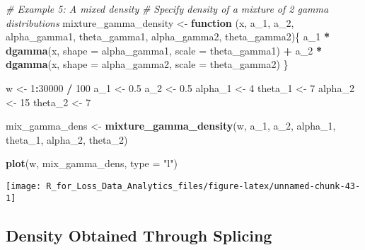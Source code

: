\documentclass[]{book}
\newenvironment{Shaded}{\begin{snugshade}}{\end{snugshade}}
\newcommand{\KeywordTok}[1]{\textcolor[rgb]{0.13,0.29,0.53}{\textbf{#1}}}
\newcommand{\DataTypeTok}[1]{\textcolor[rgb]{0.13,0.29,0.53}{#1}}
\newcommand{\DecValTok}[1]{\textcolor[rgb]{0.00,0.00,0.81}{#1}}
\newcommand{\FloatTok}[1]{\textcolor[rgb]{0.00,0.00,0.81}{#1}}
\newcommand{\StringTok}[1]{\textcolor[rgb]{0.31,0.60,0.02}{#1}}
\newcommand{\CommentTok}[1]{\textcolor[rgb]{0.56,0.35,0.01}{\textit{#1}}}
\newcommand{\ControlFlowTok}[1]{\textcolor[rgb]{0.13,0.29,0.53}{\textbf{#1}}}
\newcommand{\OperatorTok}[1]{\textcolor[rgb]{0.81,0.36,0.00}{\textbf{#1}}}
\newcommand{\NormalTok}[1]{#1}
\theoremstyle{definition}
\theoremstyle{definition}
\theoremstyle{definition}
\theoremstyle{remark}
\begin{document}
\begin{Shaded}
\begin{Highlighting}[]
\CommentTok{# Example 5: A mixed density}
\CommentTok{# Specify density of a mixture of 2 gamma distributions}
\NormalTok{mixture_gamma_density <-}\StringTok{ }\ControlFlowTok{function}\NormalTok{ (x, a_}\DecValTok{1}\NormalTok{, a_}\DecValTok{2}\NormalTok{, alpha_gamma1, theta_gamma1, alpha_gamma2,}
\NormalTok{                                   theta_gamma2)\{}
\NormalTok{  a_}\DecValTok{1} \OperatorTok{*}\StringTok{ }\KeywordTok{dgamma}\NormalTok{(x, }\DataTypeTok{shape =}\NormalTok{ alpha_gamma1, }\DataTypeTok{scale =}\NormalTok{ theta_gamma1) }\OperatorTok{+}\StringTok{ }\NormalTok{a_}\DecValTok{2} \OperatorTok{*}\StringTok{ }
\StringTok{    }\KeywordTok{dgamma}\NormalTok{(x, }\DataTypeTok{shape =}\NormalTok{ alpha_gamma2, }\DataTypeTok{scale =}\NormalTok{ theta_gamma2)}
\NormalTok{\}}

\NormalTok{w <-}\StringTok{ }\DecValTok{1}\OperatorTok{:}\DecValTok{30000} \OperatorTok{/}\StringTok{ }\DecValTok{100}
\NormalTok{a_}\DecValTok{1}\NormalTok{ <-}\StringTok{ }\FloatTok{0.5}
\NormalTok{a_}\DecValTok{2}\NormalTok{ <-}\StringTok{ }\FloatTok{0.5}
\NormalTok{alpha_}\DecValTok{1}\NormalTok{ <-}\StringTok{ }\DecValTok{4}
\NormalTok{theta_}\DecValTok{1}\NormalTok{ <-}\StringTok{ }\DecValTok{7}
\NormalTok{alpha_}\DecValTok{2}\NormalTok{ <-}\StringTok{ }\DecValTok{15}
\NormalTok{theta_}\DecValTok{2}\NormalTok{ <-}\StringTok{ }\DecValTok{7}

\NormalTok{mix_gamma_dens <-}\StringTok{ }\KeywordTok{mixture_gamma_density}\NormalTok{(w, a_}\DecValTok{1}\NormalTok{, a_}\DecValTok{2}\NormalTok{, alpha_}\DecValTok{1}\NormalTok{, theta_}\DecValTok{1}\NormalTok{, alpha_}\DecValTok{2}\NormalTok{, theta_}\DecValTok{2}\NormalTok{)}

\KeywordTok{plot}\NormalTok{(w, mix_gamma_dens, }\DataTypeTok{type =} \StringTok{"l"}\NormalTok{)}
\end{Highlighting}
\end{Shaded}

\begin{center}\texttt{[image: R\_for\_Loss\_Data\_Analytics\_files/figure-latex/unnamed-chunk-43-1]} \end{center}

\subsection{Density Obtained Through
Splicing}\label{density-obtained-through-splicing}
\end{document}
